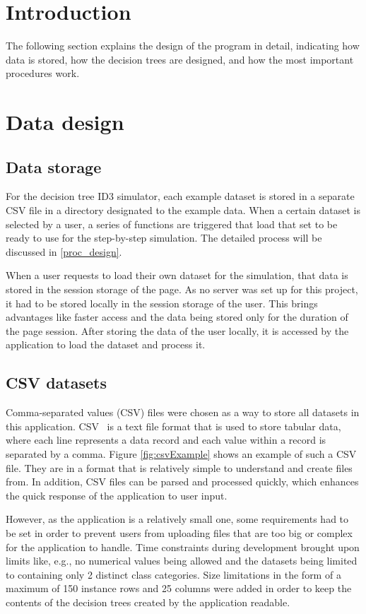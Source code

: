 
\section{Introduction}
The following section explains the design of the program in detail, indicating how data is stored, how the decision trees are designed, and how the most important procedures work.

\section{Data design}
\subsection{Data storage}
For the decision tree ID3 simulator, each example dataset is stored in a separate CSV file in a directory designated to the example data. When a certain dataset is selected by a user, a series of functions are triggered that load that set to be ready to use for the step-by-step simulation. The detailed process will be discussed in \ref{proc_design}. 

When a user requests to load their own dataset for the simulation, that data is stored in the session storage of the page. As no server was set up for this project, it had to be stored locally in the session storage of the user. This brings advantages like faster access and the data being stored only for the duration of the page session. After storing the data of the user locally, it is accessed by the application to load the dataset and process it.

\subsection{CSV datasets}
Comma-separated values (CSV) files were chosen as a way to store all datasets in this application. CSV~\cite{csv_wiki} is a text file format that is used to store tabular data, where each line represents a data record and each value within a record is separated by a comma. Figure \ref{fig:csvExample} shows an example of such a CSV file. They are in a format that is relatively simple to understand and create files from. In addition, CSV files can be parsed and processed quickly, which enhances the quick response of the application to user input.

However, as the application is a relatively small one, some requirements had to be set in order to prevent users from uploading files that are too big or complex for the application to handle. Time constraints during development brought upon limits like, e.g., no numerical values being allowed and the datasets being limited to containing only 2 distinct class categories. Size limitations in the form of a maximum of 150 instance rows and 25 columns were added in order to keep the contents of the decision trees created by the application readable.

